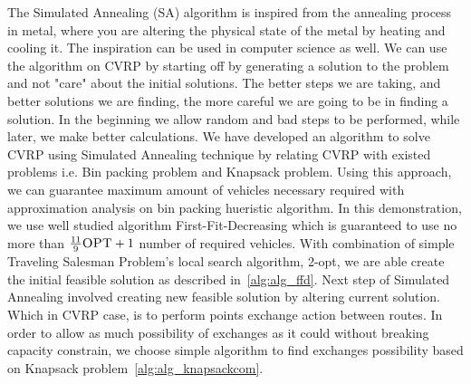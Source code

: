 \documentclass[12pt]{article}
\begin{document}
The Simulated Annealing (SA) algorithm is inspired from the annealing process in metal, where you are altering the physical state of the metal 
by heating and cooling it. The inspiration can be used in computer science as well. We can use the algorithm on CVRP by starting off by generating a solution 
to the problem and not "care" about the initial solutions. The better steps we are taking, and better solutions we are finding, the more careful we are going to be in finding 
a solution. In the beginning we allow random and bad steps to be performed, while later, we make better calculations.
\newline
We have developed an algorithm to solve CVRP using Simulated Annealing technique by relating CVRP with existed problems i.e. Bin packing problem and Knapsack problem. Using this approach, we can guarantee maximum amount of vehicles necessary required with approximation analysis on bin packing hueristic algorithm. In this demonstration, we use well studied  algorithm First-Fit-Decreasing which is guaranteed to use no more than $\frac{11}{9}\textsc{OPT} + 1$ number of required vehicles\cite{FFD}. With combination of simple Traveling Salesman Problem's local search algorithm, 2-opt, we are able create the initial feasible solution as described in~\ref{alg:alg_ffd}. Next step of Simulated Annealing involved creating new feasible solution by altering current solution. Which in CVRP case, is to perform points exchange action between routes. In order to allow as much possibility of exchanges as it could without breaking capacity constrain, we choose simple algorithm to find exchanges possibility based on Knapsack problem~\ref{alg:alg_knapsackcom}.
\end{document}
